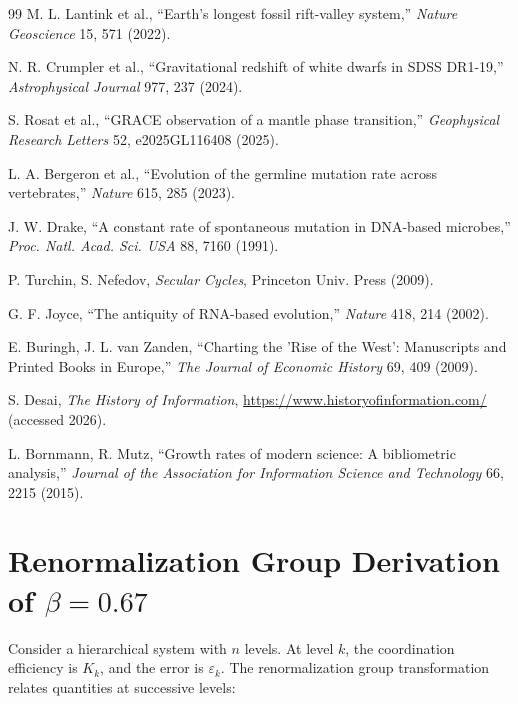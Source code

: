 \documentclass[12pt,a4paper]{article}
\theoremstyle{remark}
\newcommand{\eps}{\varepsilon}
\begin{document}
\begin{thebibliography}{99}
		M. L. Lantink et al., ``Earth's longest fossil rift-valley system,'' \emph{Nature Geoscience} 15, 571 (2022).
		
		N. R. Crumpler et al., ``Gravitational redshift of white dwarfs in SDSS DR1-19,'' \emph{Astrophysical Journal} 977, 237 (2024).
		
		S. Rosat et al., ``GRACE observation of a mantle phase transition,'' \emph{Geophysical Research Letters} 52, e2025GL116408 (2025).
		
		L. A. Bergeron et al., ``Evolution of the germline mutation rate across vertebrates,'' \emph{Nature} 615, 285 (2023).
		
		J. W. Drake, ``A constant rate of spontaneous mutation in DNA-based microbes,'' \textit{Proc. Natl. Acad. Sci. USA} 88, 7160 (1991).
		
		P. Turchin, S. Nefedov, \emph{Secular Cycles}, Princeton Univ. Press (2009).
		
		G. F. Joyce, ``The antiquity of RNA-based evolution,'' \textit{Nature} 418, 214 (2002).
		
		E. Buringh, J. L. van Zanden, ``Charting the 'Rise of the West': Manuscripts and Printed Books in Europe,'' \emph{The Journal of Economic History} 69, 409 (2009).
		
		S. Desai, \emph{The History of Information}, \url{https://www.historyofinformation.com/} (accessed 2026).
		
		L. Bornmann, R. Mutz, ``Growth rates of modern science: A bibliometric analysis,'' \emph{Journal of the Association for Information Science and Technology} 66, 2215 (2015).
		
	\end{thebibliography}
	
	\appendix
	
	\section{Renormalization Group Derivation of $\beta = 0.67$}
	\label{app:rg}
	
	Consider a hierarchical system with $n$ levels. At level $k$, the coordination efficiency is $K_k$, and the error is $\eps_k$. The renormalization group transformation relates quantities at successive levels:
	
\end{document}
